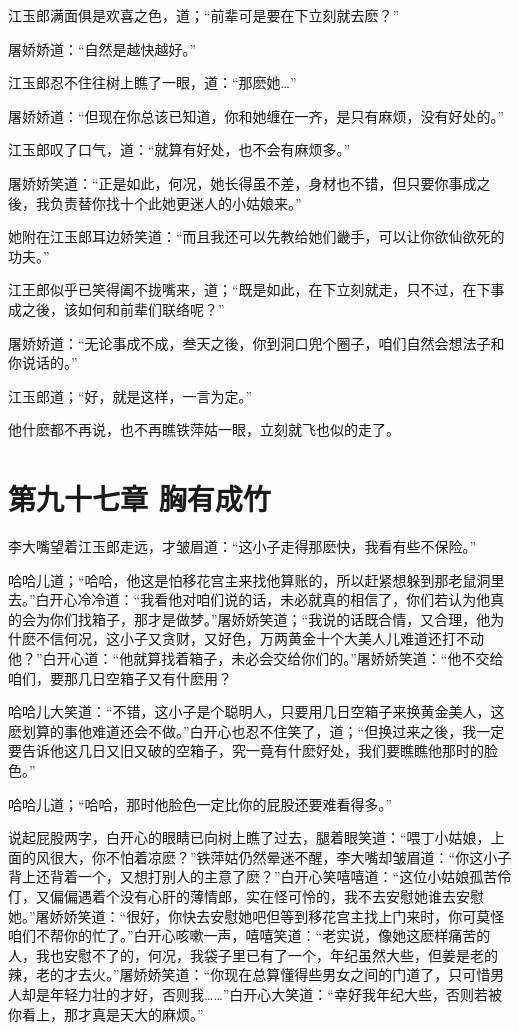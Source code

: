 \documentclass[12pt,oneside]{book}
\begin{document}
江玉郎满面俱是欢喜之色，道；``前辈可是要在下立刻就去麽？''

屠娇娇道：``自然是越快越好。''

江玉郎忍不住往树上瞧了一眼，道：``那麽她\ldots{}''

屠娇娇道：``但现在你总该已知道，你和她缠在一齐，是只有麻烦，没有好处的。''

江玉郎叹了口气，道：``就算有好处，也不会有麻烦多。''

屠娇娇笑道：``正是如此，何况，她长得虽不差，身材也不错，但只要你事成之後，我负责替你找十个此她更迷人的小姑娘来。''

她附在江玉郎耳边娇笑道：``而且我还可以先教给她们畿手，可以让你欲仙欲死的功夫。''

江王郎似乎已笑得阖不拢嘴来，道；``既是如此，在下立刻就走，只不过，在下事成之後，该如何和前辈们联络呢？''

屠娇娇道：``无论事成不成，叁天之後，你到洞口兜个圈子，咱们自然会想法子和你说话的。''

江玉郎道；``好，就是这样，一言为定。''

他什麽都不再说，也不再瞧铁萍姑一眼，立刻就飞也似的走了。

\hypertarget{ux7b2cux4e5dux5341ux4e03ux7ae0-ux80f8ux6709ux6210ux7af9}{%
\chapter{第九十七章
胸有成竹}\label{ux7b2cux4e5dux5341ux4e03ux7ae0-ux80f8ux6709ux6210ux7af9}}

李大嘴望着江玉郎走远，才皱眉道：``这小子走得那麽快，我看有些不保险。''

哈哈儿道；``哈哈，他这是怕移花宫主来找他算账的，所以赶紧想躲到那老鼠洞里去。''白开心冷冷道：``我看他对咱们说的话，未必就真的相信了，你们若认为他真的会为你们找箱子，那才是做梦。''屠娇娇笑道；``我说的话既合情，又合理，他为什麽不信何况，这小子又贪财，又好色，万两黄金十个大美人儿难道还打不动他？''白开心道：``他就算找着箱子，未必会交给你们的。''屠娇娇笑道：``他不交给咱们，要那几日空箱子又有什麽用？

哈哈儿大笑道：``不错，这小子是个聪明人，只要用几日空箱子来换黄金美人，这麽划算的事他难道还会不做。''白开心也忍不住笑了，道；``但换过来之後，我一定要告诉他这几日又旧又破的空箱子，究一竟有什麽好处，我们要瞧瞧他那时的脸色。''

哈哈儿道；``哈哈，那时他脸色一定比你的屁股还要难看得多。''

说起屁股两字，白开心的眼睛已向树上瞧了过去，腿着眼笑道：``喂丁小姑娘，上面的风很大，你不怕着凉麽？''铁萍姑仍然晕迷不醒，李大嘴却皱眉道：``你这小子背上还背着一个，又想打别人的主意了麽？''白开心笑嘻嘻道：``这位小姑娘孤苦伶仃，又偏偏遇着个没有心肝的薄情郎，实在怪可怜的，我不去安慰她谁去安慰她。''屠娇娇笑道：``很好，你快去安慰她吧但等到移花宫主找上门来时，你可莫怪咱们不帮你的忙了。''白开心咳嗽一声，嘻嘻笑道：``老实说，像她这麽样痛苦的人，我也安慰不了的，何况，我袋子里已有了一个，年纪虽然大些，但姜是老的辣，老的才去火。''屠娇娇笑道：``你现在总算懂得些男女之间的门道了，只可惜男人却是年轻力壮的才好，否则我\ldots\ldots{}''白开心大笑道：``幸好我年纪大些，否则若被你看上，那才真是天大的麻烦。''
\end{document}
